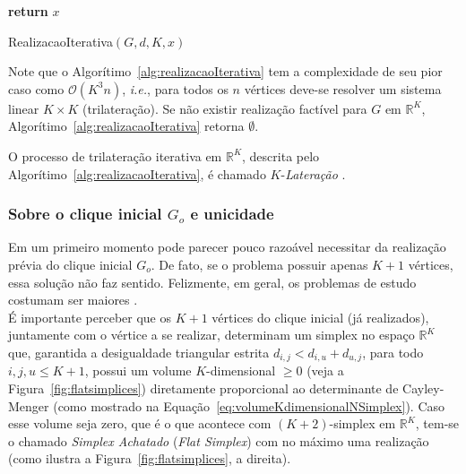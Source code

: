 \begin{algorithm}[H]
	\label{alg:realizacaoIterativa}
	\textbf{return} $x$\;
	\caption{RealizacaoIterativa$(G,d, K, x)$ \cite{libertiEDG}}
\end{algorithm}
\vspace{0.5cm}
Note que o Algorítimo~\ref{alg:realizacaoIterativa} tem a complexidade de seu pior caso como $\mathcal{O}(K^3n)$, \textit{i.e.}, para todos os $n$ vértices deve-se resolver um sistema linear $K\times K$ (trilateração). Se não existir realização factível para $G$ em $\mathbb{R}^K$, Algorítimo~\ref{alg:realizacaoIterativa} retorna $\emptyset$.

\begin{definicao}[K-lateração]
	O processo de trilateração iterativa em $\mathbb{R}^K$, descrita pelo Algorítimo~\ref{alg:realizacaoIterativa}, é chamado $K$-\textit{Lateração} \cite{eren2004rigidity}.
\end{definicao}

\subsubsection{Sobre o clique inicial $G_o$ e unicidade \label{sec:go}}
Em um primeiro momento pode parecer pouco razoável necessitar da realização prévia do clique inicial $G_o$. De fato, se o problema possuir apenas $K+1$ vértices, essa solução não faz sentido. Felizmente, em geral, os problemas de estudo costumam ser maiores \cite{carlileGDandAplications}.
\\

É importante perceber que os $K+1$ vértices do clique inicial (já realizados), juntamente com o vértice a se realizar, determinam um simplex no espaço $\mathbb{R}^K$ que, garantida a desigualdade triangular estrita $d_{i,j} < d_{i,u} + d_{u,j}$, para todo $i,j,u \leq K+1$, possui um volume $K$-dimensional $\geq 0$ (veja a Figura~\ref{fig:flatsimplices}) diretamente proporcional ao determinante de Cayley-Menger (como mostrado na Equação~\ref{eq:volumeKdimensionalNSimplex}). Caso esse volume seja zero, que é o que acontece com $(K+2)$-simplex em $\mathbb{R}^K$, tem-se o chamado \textit{Simplex Achatado} (\textit{Flat Simplex}) com no máximo uma realização (como ilustra a Figura~\ref{fig:flatsimplices}, a direita).

